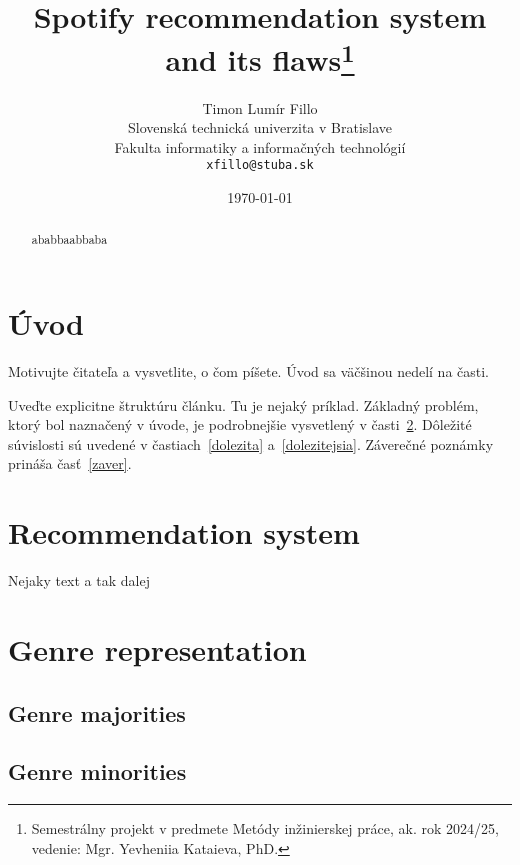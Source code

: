 \documentclass[10pt,twoside,slovak,a4paper]{article}
\title{Spotify recommendation system and its flaws\thanks{Semestrálny projekt v predmete Metódy inžinierskej práce, ak. rok 2024/25, vedenie: Mgr. Yevheniia Kataieva, PhD.}} %
\author{Timon Lumír Fillo\\[2pt]
	{\small Slovenská technická univerzita v Bratislave}\\
	{\small Fakulta informatiky a informačných technológií}\\
	{\small \texttt{xfillo@stuba.sk}}
	}
\date{\small \today} %
\begin{document}
\maketitle

\begin{abstract}
ababbaabbaba
\end{abstract}



\section{Úvod}

Motivujte čitateľa a vysvetlite, o čom píšete. Úvod sa väčšinou nedelí na časti.

Uveďte explicitne štruktúru článku. Tu je nejaký príklad.
Základný problém, ktorý bol naznačený v úvode, je podrobnejšie vysvetlený v časti~\ref{recommendationsystem}.
Dôležité súvislosti sú uvedené v častiach~\ref{dolezita} a~\ref{dolezitejsia}.
Záverečné poznámky prináša časť~\ref{zaver}.


\section{Recommendation system} \label{recommendationsystem}
\cite{hodgson2021spotify,}
Nejaky text
a tak dalej
\section{Genre representation} \label{genre}
\subsection{Genre majorities} \label{genre:majorities}
\subsection{Genre minorities} \label{genre:minotiries}
\end{document}

